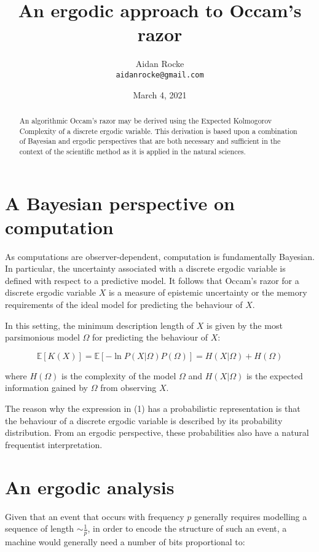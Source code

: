 \documentclass{article}
\title{An ergodic approach to Occam's razor}
\date{March 4, 2021}
\author{%
  Aidan Rocke\\
  \texttt{aidanrocke@gmail.com} \\
}
\begin{document}
\maketitle

\begin{abstract}
An algorithmic Occam's razor may be derived using the Expected Kolmogorov Complexity of a discrete ergodic variable. This derivation is based upon a combination of Bayesian and ergodic perspectives that are both necessary and sufficient in the context of the scientific method as it is applied in the natural sciences. 
\end{abstract}


\section{A Bayesian perspective on computation}

As computations are observer-dependent, computation is fundamentally Bayesian. In particular, the uncertainty associated with a discrete ergodic variable is defined with respect to a predictive model.
It follows that Occam's razor for a discrete ergodic variable $X$ is a measure of epistemic uncertainty or the memory
requirements of the ideal model for predicting the behaviour of $X$.

In this setting, the minimum description length of $X$ is given by the most parsimonious model $\Omega$ for
predicting the behaviour of $X$:

\begin{equation}
\mathbb{E}[K(X)] = \mathbb{E}[-\ln P(X\lvert \Omega)P(\Omega)] = H(X \lvert \Omega) + H(\Omega)
\end{equation}

where $H(\Omega)$ is the complexity of the model $\Omega$ and $H(X \lvert \Omega)$ is the expected information
gained by $\Omega$ from observing $X$. 

The reason why the expression in (1) has a probabilistic representation is that the behaviour of a discrete ergodic variable
is described by its probability distribution. From an ergodic perspective, these
probabilities also have a natural frequentist interpretation. 

\section{An ergodic analysis}

Given that an event that occurs with frequency $p$ generally requires modelling a sequence of length $\sim \frac{1}{p}$,
in order to encode the structure of such an event, a machine would generally need a number of bits proportional to:
\end{document}

